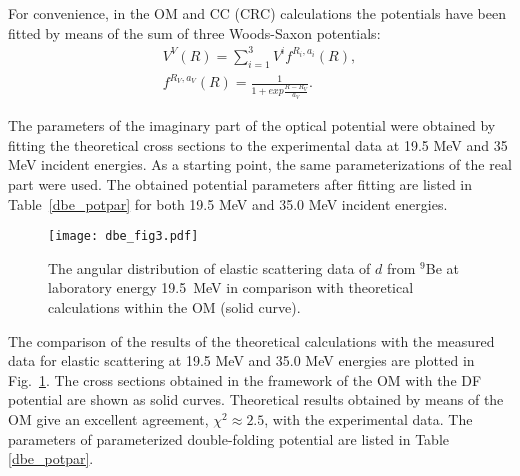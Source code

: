 \documentclass[
12pt, %
oneside, %
english, %
onehalfspacing, %
onehalfspacing, %
headsepline, %
]{MastersDoctoralThesis} %
\begin{document}
For convenience, in the OM and CC (CRC) calculations the potentials have been fitted by means of the sum of three Woods-Saxon potentials:
\begin{eqnarray}
V^V(R) =  \sum_{i=1}^{3} V^i f^{R_i, a_i}(R), \\
 f^{R_V,a_V}(R)=\frac{1}{1+exp{\frac{R-R_V}{a_V}}}.
\end{eqnarray}

The parameters of the imaginary part of the optical potential were obtained by fitting the theoretical cross sections to the experimental data at 19.5 MeV and 35 MeV incident energies. As a starting point, the same parameterizations of the real part were used. The obtained potential parameters after fitting are listed in Table~\ref{dbe_potpar} for both 19.5 MeV and 35.0 MeV incident energies.

\begin{figure}[tp]
\centering
\texttt{[image: dbe\_fig3.pdf]}
\decoRule
\caption{ \label{dbe_fig3} \footnotesize The angular distribution of elastic scattering data of $d$ from ${}^9$Be at laboratory energy 19.5~MeV in comparison with theoretical calculations within the OM (solid curve). }
\end{figure}

The comparison of the results of the theoretical calculations with  the measured data for elastic scattering at 19.5 MeV and 35.0 MeV energies are plotted in Fig.~\ref{dbe_fig3}. 
The cross sections obtained in the framework of the OM with the DF potential are shown as solid curves. 
Theoretical results obtained by means of the OM give an excellent agreement, $\chi^2\approx2.5$, with the experimental data. The  parameters of  parameterized double-folding potential are listed in Table \ref{dbe_potpar}. 
\end{document}
